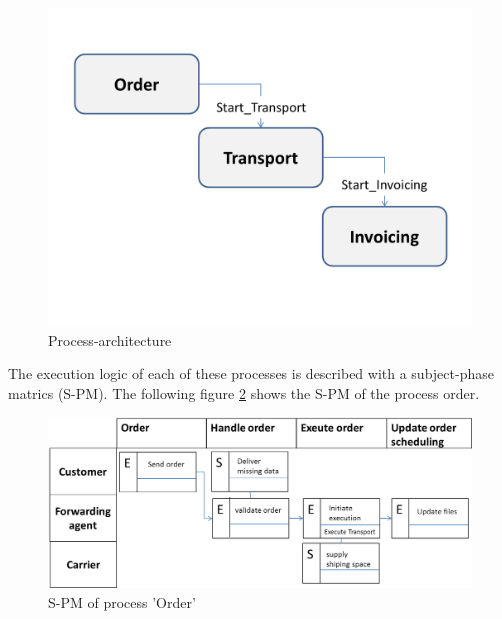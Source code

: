 \begin{figure}[hbtp]
	\includegraphics[scale=0.2]{Figures/Chapter5/Subject-Phase/process-architecture.png}
	\caption{Process-architecture}
	\label{fig:process-arch}
\end{figure}

The execution logic of each of these processes is described with a subject-phase matrics (S-PM). The following figure \ref{fig:S-PM-Order} shows the S-PM of the process order.

\begin{figure}[hbtp]
	\includegraphics[scale=0.2]{Figures/Chapter5/Subject-Phase/S-PM-process-Ortder.png}
	\caption{S-PM of process 'Order'}
	\label{fig:S-PM-Order}
\end{figure}

